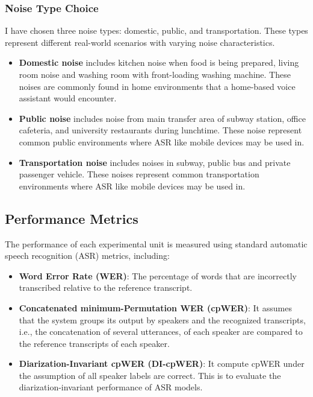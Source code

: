 \subsubsection{Noise Type Choice}
I have chosen three noise types: domestic, public, and transportation. These types represent different real-world scenarios with varying noise characteristics.
\begin{itemize}
    \item \textbf{Domestic noise} includes kitchen noise when food is being prepared, living room noise and washing room with front-loading washing machine. These noises are commonly found in home environments that a home-based voice assistant would encounter.
    \item \textbf{Public noise} includes noise from main transfer area of subway station, office cafeteria, and university restaurants during lunchtime. These noise represent common public environments where ASR like mobile devices may be used in.
    \item \textbf{Transportation noise} includes noises in subway, public bus and private passenger vehicle. These noises represent common transportation environments where ASR like mobile devices may be used in.
\end{itemize}


\subsection{Performance Metrics}
The performance of each experimental unit is measured using standard automatic speech recognition (ASR) metrics, including:
\begin{itemize}
    \item \textbf{Word Error Rate (WER)}: The percentage of words that are incorrectly transcribed relative to the reference transcript.
    \item \textbf{Concatenated minimum-Permutation WER (cpWER)}: It assumes that the system groups its output by speakers and the recognized transcripts, i.e., the concatenation of several utterances, of each speaker are compared to the reference transcripts of each speaker. 
    \item \textbf{Diarization-Invariant cpWER (DI-cpWER)}: It compute cpWER under the assumption of all speaker labels are correct. This is to evaluate the diarization-invariant performance of ASR models. \cite{Word_Error_Rate_Definitions}
\end{itemize}
